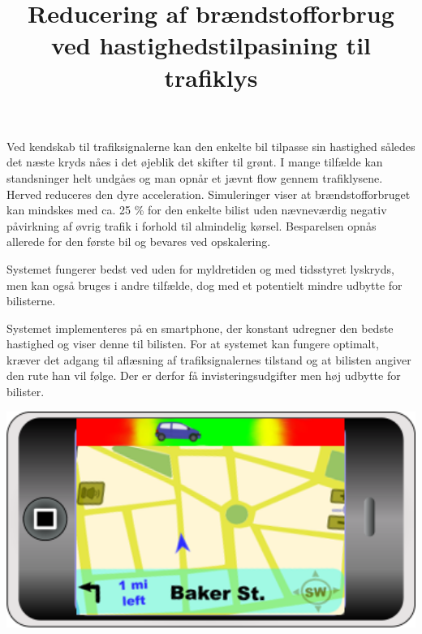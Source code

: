 \documentclass{article}
\title{Reducering af brændstofforbrug ved hastighedstilpasining til trafiklys}
\date{}
\begin{document}
\maketitle

Ved kendskab til trafiksignalerne kan den enkelte bil tilpasse sin hastighed således det næste kryds nåes i det øjeblik det skifter til grønt.
I mange tilfælde kan standsninger helt undgåes og man opnår et jævnt flow gennem trafiklysene.
Herved reduceres den dyre acceleration.
Simuleringer viser at brændstofforbruget kan mindskes med ca. 25 \% for den enkelte bilist uden nævneværdig negativ påvirkning af øvrig trafik i forhold til almindelig kørsel.
Besparelsen opnås allerede for den første bil og bevares ved opskalering.

Systemet fungerer bedst ved uden for myldretiden og med tidsstyret lyskryds, men kan også bruges i andre tilfælde, dog med et potentielt mindre udbytte for bilisterne.

Systemet implementeres på en smartphone, der konstant udregner den bedste hastighed og viser denne til bilisten. 
For at systemet kan fungere optimalt, kræver det adgang til aflæsning af trafiksignalernes tilstand og at bilisten angiver den rute han vil følge.
Der er derfor få invisteringsudgifter men høj udbytte for bilister.

\includegraphics[width=1\textwidth]{images/product.png}

\end{document}
